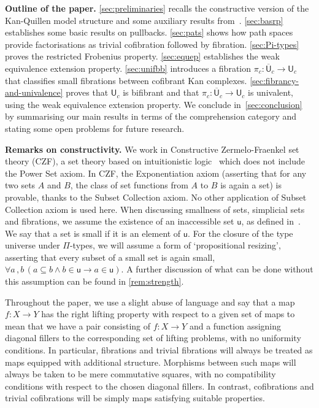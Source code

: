 \documentclass[reqno,10pt,a4paper,oneside]{amsart}
\numberwithin{equation}{section}
\theoremstyle{mythm}
\theoremstyle{mydef}
\theoremstyle{myrmk}
\newcommand{\ie}{\text{i.e.\ }}
\newcommand{\co}{\colon}
\newcommand{\UU}{\overline{\mathsf{U}}}
\newcommand{\U}{\mathsf{U}}
\begin{document}
\smallskip

\noindent 
\textbf{Outline of the paper.} \cref{sec:preliminaries} recalls the constructive version of the 
Kan-Quillen model structure and some auxiliary results from~\cite{henry2019qms}. \cref{sec:basrp} establishes some basic results on pullbacks. \cref{sec:pats} shows how path spaces provide factorisations
as trivial cofibration followed by fibration. \cref{sec:Pi-types} proves the restricted Frobenius property. \cref{sec:equep}
establishes the weak equivalence extension property.
\cref{sec:unifbb} introduces a fibration $\pi_c \co \UU_c \to \U_c$ that classifies small fibrations
between cofibrant Kan complexes. \cref{sec:fibrancy-and-univalence} proves that $\U_c$ is bifibrant and that $\pi_c \co \UU_c \to \U_c$ is univalent, using the weak equivalence extension property.
We conclude in~\cref{sec:conclusion} by summarising our main results in terms of
the comprehension category and stating some open problems for future research.

\smallskip

\noindent
\textbf{Remarks on constructivity.} We work in Constructive Zermelo-Fraenkel set theory (CZF),
a set theory based on intuitionistic logic~\cite{AczelP:typtic-I} which does not include the Power Set axiom.
In CZF, the Exponentiation axiom (asserting that for any two sets $A$ and $B$, the class of set functions from $A$ to $B$ is again a set)
is provable, thanks to the Subset Collection axiom. No other application of Subset Collection axiom is used here.
When discussing smallness of sets,
simplicial sets and fibrations, we assume the existence of an inaccessible set $\mathsf{u}$, as defined 
in~\cite[Definition~18.1.2]{AczelP:notcst}. We say that a set is small if it is an element of $\mathsf{u}$.
For the closure of the type universe under $\Pi$-types, we will assume a form of `propositional resizing', asserting that every subset 
of a small set is again small, \ie  $\forall a \, , b \,  ( a \subseteq b \land b \in \mathsf{u} \rightarrow a \in \mathsf{u} )$.  A further discussion of what can be done without this assumption can be found in \cref{rem:strength}. 

Throughout the paper, we use a slight abuse of language and say that a map $f \co X \to Y$ has
the right lifting property with respect to a given set of maps to mean that we have a pair consisting
of $f \co X \to Y$ and a function assigning diagonal fillers to the corresponding set of lifting problems, with
no uniformity conditions. In particular, fibrations and trivial fibrations will always be treated as maps equipped with additional structure. Morphisms between such maps will always be taken to be mere commutative squares, with no compatibility conditions with respect to the chosen diagonal fillers. In contrast, cofibrations and
trivial cofibrations will be simply maps satisfying suitable properties.
\end{document}
